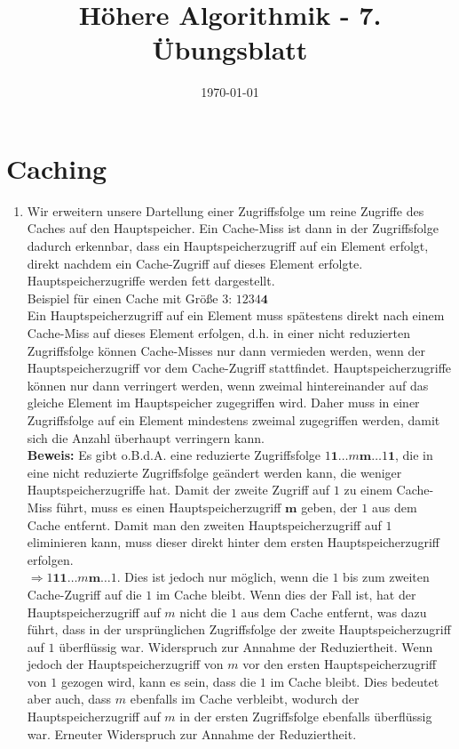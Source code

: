 \documentclass[a4paper,10pt]{article}
\title{H\"ohere Algorithmik - 7. \"Ubungsblatt}
\author{\Authors}
\date{\today}
\begin{document}
\maketitle

\section{Caching}
\begin{enumerate}
\item Wir erweitern unsere Dartellung einer Zugriffsfolge um reine Zugriffe des Caches auf den Hauptspeicher. Ein Cache-Miss ist dann in der Zugriffsfolge dadurch erkennbar, dass ein Hauptspeicherzugriff auf ein Element erfolgt, direkt nachdem ein Cache-Zugriff auf dieses Element erfolgte. Hauptspeicherzugriffe werden fett dargestellt.\\
Beispiel für einen Cache mit Größe $3$: $1234\textbf{4}$\\
Ein Hauptspeicherzugriff auf ein Element muss spätestens direkt nach einem Cache-Miss auf dieses Element erfolgen, d.h. in einer nicht reduzierten Zugriffsfolge können Cache-Misses nur dann vermieden werden, wenn der Hauptspeicherzugriff vor dem Cache-Zugriff stattfindet. Hauptspeicherzugriffe können nur dann verringert werden, wenn zweimal hintereinander auf das gleiche Element im Hauptspeicher zugegriffen wird. Daher muss in einer Zugriffsfolge auf ein Element mindestens zweimal zugegriffen werden, damit sich die Anzahl überhaupt verringern kann.\\
\textbf{Beweis:} Es gibt o.B.d.A. eine reduzierte Zugriffsfolge $1\textbf{1} \ldots m\textbf{m} \ldots 1\textbf{1}$, die in eine nicht reduzierte Zugriffsfolge geändert werden kann, die weniger Hauptspeicherzugriffe hat. Damit der zweite Zugriff auf $1$ zu einem Cache-Miss führt, muss es einen Hauptspeicherzugriff $\textbf{m}$ geben, der $1$ aus dem Cache entfernt. Damit man den zweiten Hauptspeicherzugriff auf $1$ eliminieren kann, muss dieser direkt hinter dem ersten Hauptspeicherzugriff erfolgen.\\
$\Rightarrow 1\textbf{11} \ldots m\textbf{m} \ldots 1$. Dies ist jedoch nur möglich, wenn die $1$ bis zum zweiten Cache-Zugriff auf die $1$ im Cache bleibt. Wenn dies der Fall ist, hat der Hauptspeicherzugriff auf $m$ nicht die $1$ aus dem Cache entfernt, was dazu führt, dass in der ursprünglichen Zugriffsfolge der zweite Hauptspeicherzugriff auf $1$ überflüssig war. Widerspruch zur Annahme der Reduziertheit. Wenn jedoch der Hauptspeicherzugriff von $m$ vor den ersten Hauptspeicherzugriff von $1$ gezogen wird, kann es sein, dass die $1$ im Cache bleibt. Dies bedeutet aber auch, dass $m$ ebenfalls im Cache verbleibt, wodurch der Hauptspeicherzugriff auf $m$ in der ersten Zugriffsfolge ebenfalls überflüssig war. Erneuter Widerspruch zur Annahme der Reduziertheit.


\end{enumerate}
\end{document}
